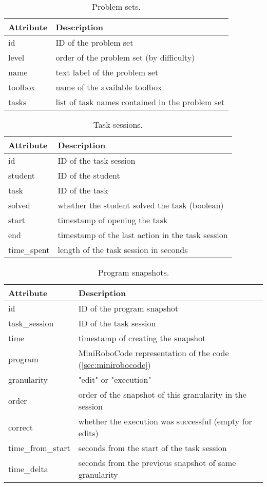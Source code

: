 
\begin{table}[htb]
\centering
\caption{Problem sets.}
\begin{tabular}{l l}
\toprule
Attribute & Description \\
\midrule
id & ID of the problem set \\
level & order of the problem set (by difficulty) \\
name & text label of the problem set \\
toolbox & name of the available toolbox \\
tasks & list of task names contained in the problem set \\
\bottomrule
\end{tabular}
\end{table}


\begin{table}[htb]
\centering
\caption{Task sessions.}
\begin{tabular}{l l}
\toprule
Attribute & Description \\
\midrule
id & ID of the task session \\
student & ID of the student \\
task & ID of the task \\
solved & whether the student solved the task (boolean) \\
start & timestamp of opening the task \\
end & timestamp of the last action in the task session \\
time\_spent & length of the task session in seconds \\
\bottomrule
\end{tabular}
\end{table}



\begin{table}[htb]
\centering
\caption{Program snapshots.}
\begin{tabular}{l l}
\toprule
Attribute & Description \\
\midrule
id & ID of the program snapshot \\
task\_session & ID of the task session \\
time & timestamp of creating the snapshot \\
program & MiniRoboCode representation of the code (\cref{sec:minirobocode}) \\
granularity & "edit" or "execution" \\
order & order of the snapshot of this granularity in the session \\
correct & whether the execution was successful (empty for edits) \\
time\_from\_start & seconds from the start of the task session \\
time\_delta & seconds from the previous snapshot of same granularity \\
\bottomrule
\end{tabular}
\end{table}
